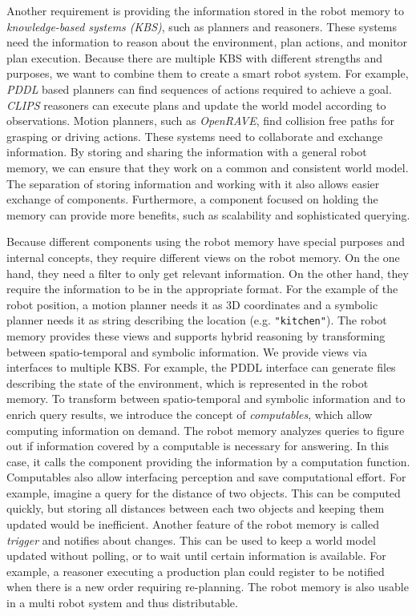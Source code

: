 Another requirement is providing the information stored in the robot
memory to \emph{knowledge-based systems (KBS)}, such as planners and
reasoners. These systems need the information to reason about the
environment, plan actions, and monitor plan execution. Because there
are multiple KBS with different strengths and purposes, we want to
combine them to create a smart robot system. For example, \emph{PDDL}
based planners can find sequences of actions required to achieve a
goal. \emph{CLIPS} reasoners can execute plans and update the world
model according to observations. Motion planners, such as
\emph{OpenRAVE}, find collision free paths for grasping or driving
actions. These systems need to collaborate and exchange
information. By storing and sharing the information with a general
robot memory, we can ensure that they work on a common and consistent
world model. The separation of storing information and working with it
also allows easier exchange of components. Furthermore, a component
focused on holding the memory can provide more benefits, such as
scalability and sophisticated querying.

Because different components using the robot memory have special
purposes and internal concepts, they require different views on the
robot memory. On the one hand, they need a filter to only get relevant
information. On the other hand, they require the information to be in
the appropriate format. For the example of the robot position, a
motion planner needs it as 3D coordinates and a symbolic planner needs
it as string describing the location (e.g. \texttt{"kitchen"}). The robot memory
provides these views and supports hybrid reasoning by transforming
between spatio-temporal and symbolic information. We provide views via
interfaces to multiple KBS. For example, the PDDL interface can
generate files describing the state of the environment, which is
represented in the robot memory.  To transform between spatio-temporal
and symbolic information and to enrich query results, we introduce the concept of
\emph{computables}, which allow computing information on demand. The
robot memory analyzes queries to figure out if information covered by
a computable is necessary for answering. In this case, it calls the
component providing the information by a computation
function. Computables also allow interfacing perception and save
computational effort. For example, imagine a query for the distance of
two objects. This can be computed quickly, but storing all distances
between each two objects and keeping them updated would be
inefficient.
%
Another feature of the robot memory is called \emph{trigger} and
notifies about changes. This can be used to keep a world model updated
without polling, or to wait until certain information is
available. For example, a reasoner executing a production plan could
register to be notified when there is a new order requiring
re-planning. The robot memory is also usable in a multi robot
system and thus distributable.

